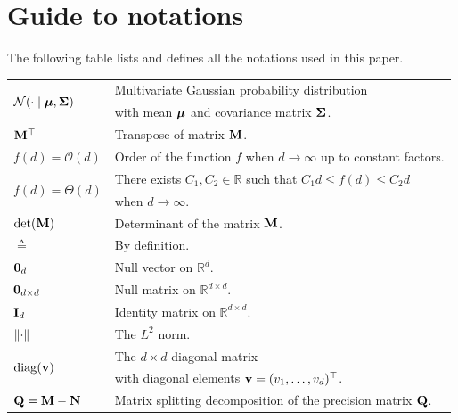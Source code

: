 \documentclass[nohypdvips,onefignum,onetabnum]{siamart171218}
\begin{document}
\newpage
\appendix

\section{Guide to notations}
\label{appendix_notations}
The following table lists and defines all the notations used in this paper.

  \begin{tabular}{ll}

    \multirow{2}{*}{$\mathcal{N}(\cdot\mid\boldsymbol{\mu},\mathbf{\Sigma})$} & Multivariate Gaussian probability distribution \\
    & with mean $\boldsymbol{\mu}$ and covariance matrix $\mathbf{\Sigma}$. \\[0.5em]

    $\mathbf{M}^{\top}$ & Transpose of matrix $\mathbf{M}$. \\[0.5em]

    $f(d) = \mathcal{O}(d)$ & Order of the function $f$ when $d \rightarrow \infty$ up to constant factors. \\[0.5em]
    
    \multirow{2}{*}{$f(d) = \Theta(d)$} & There exists $C_1,C_2 \in \mathbb{R}$ such that $C_1 d \le f(d) \le C_2 d$ \\ & when $d \rightarrow \infty$. \\[0.5em]

    $\mathrm{det}(\mathbf{M})$ & Determinant of the matrix $\mathbf{M}$. \\[0.5em]

    $\triangleq$ & By definition. \\[0.5em]

    $\mathbf{0}_d$ & Null vector on $\mathbb{R}^d$. \\[0.5em]

    $\mathbf{0}_{d \times d}$ & Null matrix on $\mathbb{R}^{d \times d}$. \\[0.5em]

    $\mathbf{I}_d$ & Identity matrix on $\mathbb{R}^{d \times d}$. \\[0.5em]

    $\left\|\cdot\right\|$ & The $L^2$ norm. \\[0.5em]

    \multirow{2}{*}{$\mathrm{diag}(\mathbf{v})$} & The $d \times d$ diagonal matrix \\
    & with diagonal elements $\mathbf{v} = (v_1,\hdots,v_d)^{\top}$. \\[0.5em]
    
    $\mathbf{Q} = \mathbf{M} - \mathbf{N}$ & Matrix splitting decomposition of the precision matrix $\mathbf{Q}$. \\[0.5em]

  \end{tabular}
\end{document}
